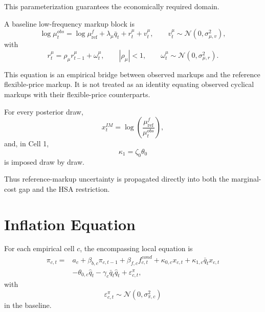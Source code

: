 \documentclass[11pt]{article}
\newcommand{\Normal}{\mathcal{N}}
\begin{document}
This parameterization guarantees the economically required domain.

A baseline low-frequency markup block is
\begin{equation}
\log\mu_t^{obs}
=
\log\mu_{\mathrm{ref}}^f
+
\lambda_\mu\bar q_t
+
r_t^\mu
+
v_t^\mu,
\qquad
v_t^\mu\sim\Normal(0,\sigma_{\mu,v}^2),
\label{eq:markup_bridge}
\end{equation}
with
\begin{equation}
r_t^\mu
=
\rho_\mu r_{t-1}^\mu+\omega_t^\mu,
\qquad
|\rho_\mu|<1,
\qquad
\omega_t^\mu\sim\Normal(0,\sigma_{\mu,r}^2).
\end{equation}

This equation is an empirical bridge between observed markups and the reference flexible-price markup. It is not treated as an identity equating observed cyclical markups with their flexible-price counterparts.

For every posterior draw,
\begin{equation}
x_t^{IM}
=
\log
\left(
\frac{\mu_{\mathrm{ref}}^f}{\mu_t^{obs}}
\right),
\end{equation}
and, in Cell 1,
\begin{equation}
\kappa_1=\zeta_0\theta_0
\end{equation}
is imposed draw by draw.

Thus reference-markup uncertainty is propagated directly into both the marginal-cost gap and the HSA restriction.

\section{Inflation Equation}

For each empirical cell \(c\), the encompassing local equation is
\begin{equation}
\boxed{
\begin{aligned}
\pi_{c,t}
={}&
a_c
+\beta_{b,c}\pi_{c,t-1}
+\beta_{f,c}f_{c,t}^{cond}
+\kappa_{0,c}x_{c,t}
+\kappa_{1,c}\bar q_tx_{c,t}\\
&-\theta_{0,c}\hat q_t
-\gamma_c\bar q_t\hat q_t
+\varepsilon_{c,t}^{\pi},
\end{aligned}
}
\label{eq:inflation_equation}
\end{equation}
with
\begin{equation}
\varepsilon_{c,t}^{\pi}
\sim
\Normal(0,\sigma_{\pi,c}^2)
\end{equation}
in the baseline.
\end{document}
